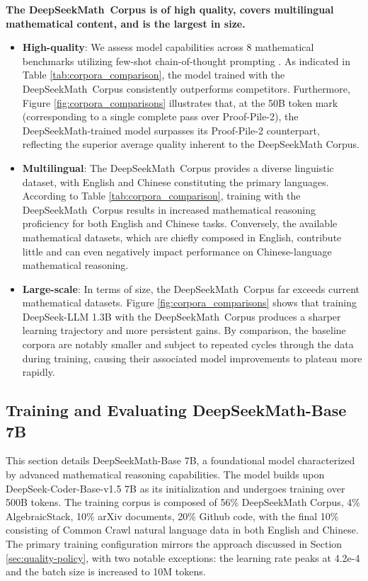 \begin{itemize}[topsep=0pt]
\textbf{The DeepSeekMath~Corpus is of high quality, covers multilingual mathematical content, and is the largest in size.}

\begin{itemize}[topsep=0pt]
    \item \textbf{High-quality}:
    We assess model capabilities across 8 mathematical benchmarks utilizing few-shot chain-of-thought prompting \cite{cot}. As indicated in Table \ref{tab:corpora_comparison}, the model trained with the DeepSeekMath~Corpus consistently outperforms competitors. Furthermore, Figure \ref{fig:corpora_comparisons} illustrates that, at the 50B token mark (corresponding to a single complete pass over Proof-Pile-2), the DeepSeekMath-trained model surpasses its Proof-Pile-2 counterpart, reflecting the superior average quality inherent to the DeepSeekMath Corpus.
    \item \textbf{Multilingual}:
    The DeepSeekMath~Corpus provides a diverse linguistic dataset, with English and Chinese constituting the primary languages. According to Table \ref{tab:corpora_comparison}, training with the DeepSeekMath~Corpus results in increased mathematical reasoning proficiency for both English and Chinese tasks. Conversely, the available mathematical datasets, which are chiefly composed in English, contribute little and can even negatively impact performance on Chinese-language mathematical reasoning.
    \item \textbf{Large-scale}:
    In terms of size, the DeepSeekMath~Corpus far exceeds current mathematical datasets. Figure \ref{fig:corpora_comparisons} shows that training DeepSeek-LLM 1.3B with the DeepSeekMath~Corpus produces a sharper learning trajectory and more persistent gains. By comparison, the baseline corpora are notably smaller and subject to repeated cycles through the data during training, causing their associated model improvements to plateau more rapidly.
\end{itemize}

\subsection{Training and Evaluating DeepSeekMath-Base 7B}

This section details DeepSeekMath-Base 7B, a foundational model characterized by advanced mathematical reasoning capabilities. The model builds upon DeepSeek-Coder-Base-v1.5 7B \citep{deepseek-coder} as its initialization and undergoes training over 500B tokens. The training corpus is composed of 56\% DeepSeekMath Corpus, 4\% AlgebraicStack, 10\% arXiv documents, 20\% Github code, with the final 10\% consisting of Common Crawl natural language data in both English and Chinese. The primary training configuration mirrors the approach discussed in Section \ref{sec:quality-policy}, with two notable exceptions: the learning rate peaks at 4.2e-4 and the batch size is increased to 10M tokens.


\end{itemize}
